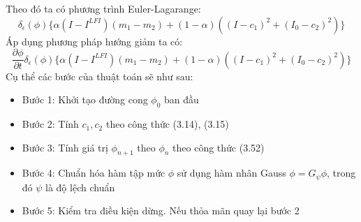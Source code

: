 \documentclass[12pt, oneside, a4]{book}
\begin{document}
Theo đó ta có phương trình Euler-Lagarange:
\begin{equation*}
\delta_{\epsilon}(\phi)\{\alpha(I-I^{LFI})(m_1-m_2)+(1-\alpha)((I-c_1)^2+ (I_0-c_2)^2)\}
\end{equation*}
Áp dụng phương pháp hướng giảm ta có:
\begin{equation}
\dfrac{\partial \phi}{\partial t} \delta_{\epsilon}(\phi)\{\alpha(I-I^{LFI})(m_1-m_2)+(1-\alpha)((I-c_1)^2+ (I_0-c_2)^2)\}
\end{equation}
Cụ thể các bước của thuật toán sẽ như sau:
\begin{itemize}
\item Bước 1: Khởi tạo đường cong $\phi_0$ ban đầu
\item Bước 2: Tính $c_1, c_2$ theo công thức  (3.14), (3.15)
\item Bước 3: Tính giá trị $\phi_{n+1}$ theo $\phi_{n}$ theo công thức (3.52)
\item Bước 4: Chuẩn hóa hàm tập mức $\phi$ sử dụng hàm nhân Gauss $\phi=G_{\psi}\phi$, trong đó $\psi$ là độ lệch chuẩn
\item Bước 5: Kiểm tra điều kiện dừng. Nếu thỏa mãn quay lại bước 2
\end{itemize}
\end{document}
